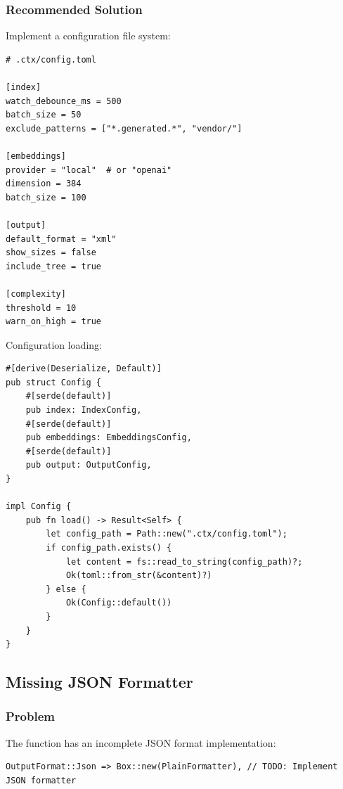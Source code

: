 \subsubsection{Recommended Solution}

Implement a configuration file system:

\begin{lstlisting}[style=bashcode, caption={Example .ctx/config.toml}]
# .ctx/config.toml

[index]
watch_debounce_ms = 500
batch_size = 50
exclude_patterns = ["*.generated.*", "vendor/"]

[embeddings]
provider = "local"  # or "openai"
dimension = 384
batch_size = 100

[output]
default_format = "xml"
show_sizes = false
include_tree = true

[complexity]
threshold = 10
warn_on_high = true
\end{lstlisting}

Configuration loading:

\begin{lstlisting}[style=rustcode, caption={Configuration loading}]
#[derive(Deserialize, Default)]
pub struct Config {
    #[serde(default)]
    pub index: IndexConfig,
    #[serde(default)]
    pub embeddings: EmbeddingsConfig,
    #[serde(default)]
    pub output: OutputConfig,
}

impl Config {
    pub fn load() -> Result<Self> {
        let config_path = Path::new(".ctx/config.toml");
        if config_path.exists() {
            let content = fs::read_to_string(config_path)?;
            Ok(toml::from_str(&content)?)
        } else {
            Ok(Config::default())
        }
    }
}
\end{lstlisting}

\subsection{Missing JSON Formatter}

\subsubsection{Problem}

The  function has an incomplete JSON format implementation:

\begin{lstlisting}[style=rustcode]
OutputFormat::Json => Box::new(PlainFormatter), // TODO: Implement JSON formatter
\end{lstlisting}

